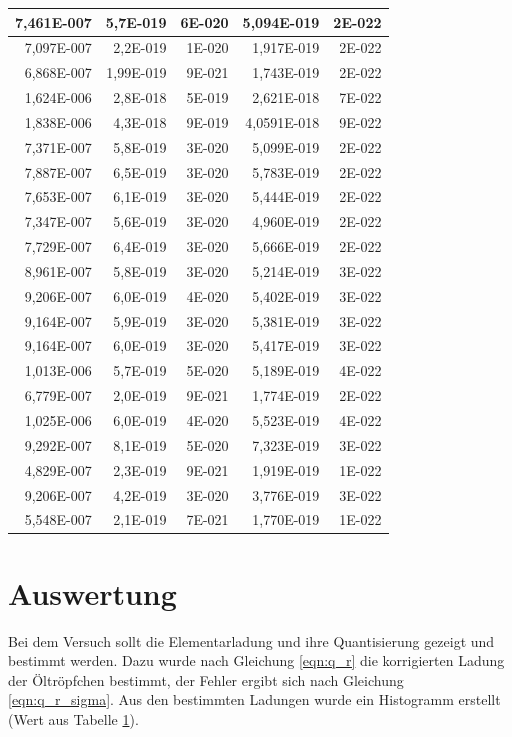 \documentclass[12pt]{scrartcl}
\begin{document}
\begin{table}[H]
\begin{center}
\begin{tabular}{|r|r|r|r|r|}
7,461E-007 & 5,7E-019 & 6E-020 & 5,094E-019 & 2E-022 \\ \hline
7,097E-007 & 2,2E-019 & 1E-020 & 1,917E-019 & 2E-022 \\ \hline
6,868E-007 & 1,99E-019 & 9E-021 & 1,743E-019 & 2E-022 \\ \hline
1,624E-006 & 2,8E-018 & 5E-019 & 2,621E-018 & 7E-022 \\ \hline
1,838E-006 & 4,3E-018 & 9E-019 & 4,0591E-018 & 9E-022 \\ \hline
7,371E-007 & 5,8E-019 & 3E-020 & 5,099E-019 & 2E-022 \\ \hline
7,887E-007 & 6,5E-019 & 3E-020 & 5,783E-019 & 2E-022 \\ \hline
7,653E-007 & 6,1E-019 & 3E-020 & 5,444E-019 & 2E-022 \\ \hline
7,347E-007 & 5,6E-019 & 3E-020 & 4,960E-019 & 2E-022 \\ \hline
7,729E-007 & 6,4E-019 & 3E-020 & 5,666E-019 & 2E-022 \\ \hline
8,961E-007 & 5,8E-019 & 3E-020 & 5,214E-019 & 3E-022 \\ \hline
9,206E-007 & 6,0E-019 & 4E-020 & 5,402E-019 & 3E-022 \\ \hline
9,164E-007 & 5,9E-019 & 3E-020 & 5,381E-019 & 3E-022 \\ \hline
9,164E-007 & 6,0E-019 & 3E-020 & 5,417E-019 & 3E-022 \\ \hline
1,013E-006 & 5,7E-019 & 5E-020 & 5,189E-019 & 4E-022 \\ \hline
6,779E-007 & 2,0E-019 & 9E-021 & 1,774E-019 & 2E-022 \\ \hline
1,025E-006 & 6,0E-019 & 4E-020 & 5,523E-019 & 4E-022 \\ \hline
9,292E-007 & 8,1E-019 & 5E-020 & 7,323E-019 & 3E-022 \\ \hline
4,829E-007 & 2,3E-019 & 9E-021 & 1,919E-019 & 1E-022 \\ \hline
9,206E-007 & 4,2E-019 & 3E-020 & 3,776E-019 & 3E-022 \\ \hline
5,548E-007 & 2,1E-019 & 7E-021 & 1,770E-019 & 1E-022 \\ \hline
\end{tabular}
\end{center}
\label{tab:messwerte_3}
\end{table}


\section{Auswertung}
Bei dem Versuch sollt die Elementarladung und ihre Quantisierung gezeigt und bestimmt werden. Dazu wurde nach Gleichung \ref{eqn:q_r} die korrigierten Ladung der Öltröpfchen bestimmt, der Fehler ergibt sich nach Gleichung \ref{eqn:q_r_sigma}. Aus den bestimmten Ladungen wurde ein Histogramm erstellt (Wert aus Tabelle \ref{tab:messwerte_3}).
\end{document}
